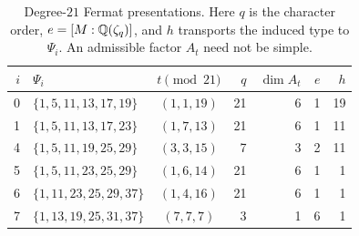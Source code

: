 \begin{table}[htbp]
\centering\small
\setlength{\tabcolsep}{4pt}
\begin{tabular}{r l c r r r r}
\toprule
$i$ & $\Psi_i$ & $t\pmod{21}$ & $q$ & $\dim A_t$ & $e$ & $h$\\
\midrule
0 & $\{1,5,11,13,17,19\}$ & $(1,1,19)$ & 21 & 6 & 1 & 19\\
1 & $\{1,5,11,13,17,23\}$ & $(1,7,13)$ & 21 & 6 & 1 & 11\\
4 & $\{1,5,11,19,25,29\}$ & $(3,3,15)$ & 7 & 3 & 2 & 11\\
5 & $\{1,5,11,23,25,29\}$ & $(1,6,14)$ & 21 & 6 & 1 & 1\\
6 & $\{1,11,23,25,29,37\}$ & $(1,4,16)$ & 21 & 6 & 1 & 1\\
7 & $\{1,13,19,25,31,37\}$ & $(7,7,7)$ & 3 & 1 & 6 & 1\\
\bottomrule
\end{tabular}
\caption{Degree-$21$ Fermat presentations. Here $q$ is the character
order, $e=[M:\mathbb Q(\zeta_q)]$, and $h$ transports the induced type to
$\Psi_i$. An admissible factor $A_t$ need not be simple.}
\label{six:tab:types}
\end{table}

